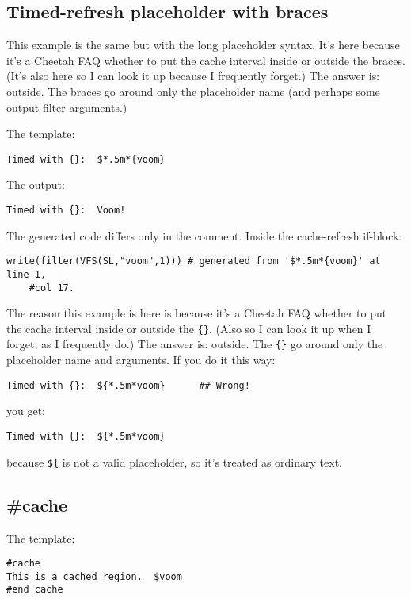 \subsection{Timed-refresh placeholder with braces}
\label{cache.timed.braces}

This example is the same but with the long placeholder syntax.  It's here 
because it's a Cheetah FAQ whether to put the cache interval inside or outside
the braces.  (It's also here so I can look it up because I frequently forget.)
The answer is: outside.  The braces go around only the placeholder name (and
perhaps some output-filter arguments.)

The template:
\begin{verbatim}
Timed with {}:  $*.5m*{voom}
\end{verbatim}

The output:
\begin{verbatim}
Timed with {}:  Voom!
\end{verbatim}

The generated code differs only in the comment.  Inside the cache-refresh
if-block:
\begin{verbatim}
write(filter(VFS(SL,"voom",1))) # generated from '$*.5m*{voom}' at line 1, 
    #col 17.
\end{verbatim}

The reason this example is here is because it's a Cheetah FAQ whether to
put the cache interval inside or outside the \verb+{}+.  (Also so I can look
it up when I forget, as I frequently do.)  The answer is: outside.  The
\verb+{}+ go around only the placeholder name and arguments.  If you do it
this way:
\begin{verbatim}
Timed with {}:  ${*.5m*voom}      ## Wrong!
\end{verbatim}
you get:
\begin{verbatim}
Timed with {}:  ${*.5m*voom}
\end{verbatim}
because \verb+${+ is not a valid placeholder, so it's treated as ordinary text.

\subsection{\#cache}
\label{cache.directive}

The template:
\begin{verbatim}
#cache
This is a cached region.  $voom
#end cache
\end{verbatim}

